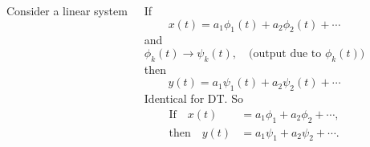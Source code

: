\begin{frame}[plain]    
    \begin{columns}
                Consider a linear system
                {
                \par
                }
                If
                \begin{equation*}
                    x(t) = a_1\phi_1(t) + a_2\phi_2(t) + \cdots
                \end{equation*}
                and
                \begin{equation*}
                    \phi_k(t) \longrightarrow \psi_k(t), \quad \text{(output due to $\phi_k(t) $)}
                \end{equation*}        
                then
                \pause
                \begin{equation*}
                    y(t) = a_1\psi_1(t) + a_2\psi_2(t) + \cdots
                \end{equation*}  
                Identical for DT. So
                \pause                
                \begin{align*}
                   \text{If}\quad x(t) &= a_1\phi_1 + a_2\phi_2 + \cdots,\\
                   \text{then}\quad y(t) &= a_1\psi_1 + a_2\psi_2 + \cdots.
                \end{align*}
                

\end{columns}
\end{frame}
